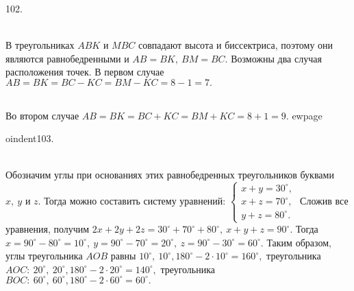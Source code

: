 102. \begin{figure}[ht!]
\end{figure}\\
В треугольниках $ABK$ и $MBC$ совпадают высота и биссектриса, поэтому они являются равнобедренными и $AB=BK,\ BM=BC.$ Возможны два случая расположения точек. В первом случае $AB=BK=BC-KC=BM-KC=8-1=7.$
 \begin{figure}[ht!]
\end{figure}\\
Во втором случае $AB=BK=BC+KC=BM+KC=8+1=9.$
ewpage

oindent103.\begin{figure}[ht!]
\end{figure}\\
Обозначим углы при основаниях этих равнобедренных треугольников буквами $x,\ y$ и $z.$ Тогда можно составить систему уравнений: $\begin{cases}x+y=30^\circ,\\
x+z=70^\circ,\\ y+z=80^\circ.\end{cases}$ Сложив все уравнения, получим $2x+2y+2z=30^\circ+70^\circ+80^\circ,\ x+y+z=90^\circ.$ Тогда $x=90^\circ-80^\circ=10^\circ,\ y=90^\circ-70^\circ=20^\circ,\ z=90^\circ-30^\circ=60^\circ.$ Таким образом, углы треугольника $AOB$ равны $10^\circ,\ 10^\circ, 180^\circ-2\cdot10^\circ=160^\circ,$ треугольника $AOC:\ 20^\circ,\ 20^\circ, 180^\circ-2\cdot20^\circ=140^\circ,$ треугольника $BOC:\ 60^\circ,\ 60^\circ, 180^\circ-2\cdot60^\circ=60^\circ.$\\
